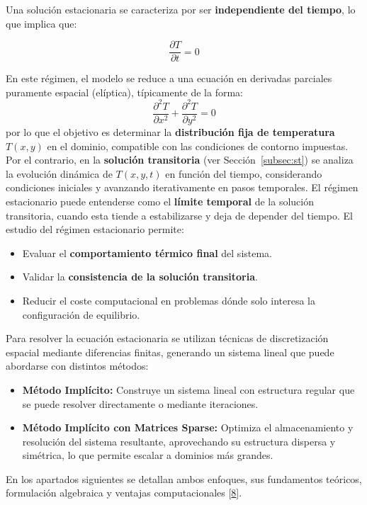 \documentclass{article}
\begin{document}
\noindent Una solución estacionaria se caracteriza por ser \textbf{independiente del tiempo}, lo que implica que:

\begin{equation}
    \frac{\partial T}{\partial t} = 0
\end{equation}

En este régimen, el modelo se reduce a una ecuación en derivadas parciales puramente espacial (elíptica), típicamente de la forma:
\begin{equation}
    \frac{\partial^2 T}{\partial x^2} + \frac{\partial^2 T}{\partial y^2} = 0
\end{equation}
por lo que el objetivo es determinar la \textbf{distribución fija de temperatura} $T(x, y)$ en el dominio, compatible con las condiciones de contorno impuestas.\\

Por el contrario, en la \textbf{solución transitoria} (ver Sección~\ref{subsec:st}) se analiza la evolución dinámica de $T(x, y, t)$ en función del tiempo, considerando condiciones iniciales y avanzando iterativamente en pasos temporales. El régimen estacionario puede entenderse como el \textbf{límite temporal} de la solución transitoria, cuando esta tiende a estabilizarse y deja de depender del tiempo. El estudio del régimen estacionario permite:

\begin{itemize}
    \item Evaluar el \textbf{comportamiento térmico final} del sistema.
    \item Validar la \textbf{consistencia de la solución transitoria}.
    \item Reducir el coste computacional en problemas dónde solo interesa la configuración de equilibrio.
\end{itemize}

Para resolver la ecuación estacionaria se utilizan técnicas de discretización espacial mediante diferencias finitas, generando un sistema lineal que puede abordarse con distintos métodos:

\begin{itemize}
    \item \textbf{Método Implícito:} Construye un sistema lineal con estructura regular que se puede resolver directamente o mediante iteraciones.
    \item \textbf{Método Implícito con Matrices Sparse:} Optimiza el almacenamiento y resolución del sistema resultante, aprovechando su estructura dispersa y simétrica, lo que permite escalar a dominios más grandes.
\end{itemize}
En los apartados siguientes se detallan ambos enfoques, sus fundamentos teóricos, formulación algebraica y ventajas computacionales [\href{https://eva.fing.edu.uy/pluginfile.php/253661/mod_resource/content/4/Capitulo1_introduccion.pdf}{8}].
\end{document}
